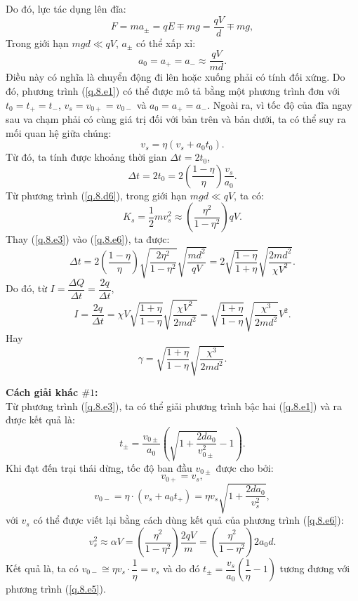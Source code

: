\begin{loigiai}
\begin{enumerate}[1)]
    Do đó, lực tác dụng lên đĩa:
    \[F = m a_{\pm} = q E \mp m g = \frac{q V}{d} \mp m g,\tag{e2}\label{q.8.e2}\]
    Trong giới hạn $m g d \ll q V$, $ a_{\pm}$ có thể xấp xỉ:
    \[a_{0} = a_{+} = a_{-} \approx \frac{q V}{m d}. \tag{e3}\label{q.8.e3}\]
    Điều này có nghĩa là chuyển động đi lên hoặc xuống phải có tính đối xứng. Do đó, phương trình (\ref{q.8.e1}) có thể được mô tả bằng một phương trình đơn với $t_0 = t_+ = t_-$, $v_s = v_{0+} = v_{0-}$ và $a_0 = a_+ = a_-$. Ngoài ra, vì tốc độ của đĩa ngay sau va chạm phải có cùng giá trị đối với bản trên và bản dưới, ta có thể suy ra mối quan hệ giữa chúng:
    \[{v}_{{s}}=\eta\left({v}_{{s}}+a_{0} t_{0}\right). \tag{e4}\label{q.8.e4}\]
    Từ đó, ta tính được khoảng thời gian $\Delta t = 2t_0$,
    \[\Delta t=2 t_{0}=2\left(\frac{1-\eta}{\eta}\right) \frac{{v}_{{s}}}{a_{0}}. \tag{e5}\label{q.8.e5}\]
    Từ phương trình (\ref{q.8.d6}), trong giới hạn $m g d \ll q V$, ta có:
    \[K_{{s}}=\dfrac{1}{2} m {v}_{{s}}^{2} \approx\left(\dfrac{\eta^{2}}{1-\eta^{2}}\right) q V.\tag{e6}\label{q.8.e6} \]
    Thay (\ref{q.8.e3}) vào (\ref{q.8.e6}), ta được:
    \[\Delta t=2\left(\dfrac{1-\eta}{\eta}\right) \sqrt{\dfrac{2 \eta^{2}}{1-\eta^{2}}} \sqrt{\dfrac{m d^{2}}{q V}}=2 \sqrt{\dfrac{1-\eta}{1+\eta}} \sqrt{\dfrac{2 m d^{2}}{\chi V^{2}}}. \tag{e7}\label{q.8.e7}\]
    Do đó, từ $I = \dfrac{\Delta Q}{\Delta t} = \dfrac{2 q}{\Delta t}$,
    \[I = \dfrac{2 q}{\Delta t}=\chi V \sqrt{\dfrac{1+\eta}{1-\eta}} \sqrt{\dfrac{\chi V^{2}}{2 m d^{2}}} = \sqrt{\dfrac{1+\eta}{1-\eta}} \sqrt{\dfrac{\chi^{3}}{2 m d^{2}}} V^{2}. \tag{e8}\label{q.8.e8}\]
    Hay 
    \[\gamma = \sqrt{\dfrac{1+\eta}{1-\eta}} \sqrt{\dfrac{\chi^{3}}{2 m d^{2}}}. \tag{e9}\label{q.8.e9}\]
    
    \textbf{Cách giải khác $\# 1$:}\\
    Từ phương trình (\ref{q.8.e3}), ta có thể giải phương trình bậc hai (\ref{q.8.e1}) và ra được kết quả là:
    \[t_{\pm}=\dfrac{{v}_{0 \pm}}{a_{0}}\left(\sqrt{1+\dfrac{2 d a_{0}}{{v}_{0 \pm}^{2}}}-1\right). \tag{e10}\label{q.8.e10} \]
    Khi đạt đến trại thái dừng, tốc độ ban đầu ${v}_{0 \pm}$ được cho bởi:
    \[{v}_{0+} = v_s, \tag{e11}\label{q.8.e11}\]
    \[{v}_{0-}=\eta \cdot\left({v}_{{s}}+a_{0} t_{+}\right)=\eta {v}_{{s}} \sqrt{1+\dfrac{2 d a_{0}}{{v}_{{s}}^{2}}}, \tag{e12}\label{q.8.e12}\]
    với $v_s$ có thể được viết lại bằng cách dùng kết quả của phương trình (\ref{q.8.e6}):
    \[{v}_{{s}}^{2} \approx \alpha V=\left(\dfrac{\eta^{2}}{1-\eta^{2}}\right) \dfrac{2 q V}{m}=\left(\dfrac{\eta^{2}}{1-\eta^{2}}\right) 2 a_{0} d. \tag{e13}\label{q.8.e13}\]
    Kết quả là, ta có ${v}_{0-} \cong \eta {v}_{{s}} \cdot \dfrac{1}{\eta}={v}_{{s}}$ và do đó $t_{\pm}=\dfrac{{v}_{{s}}}{a_{0}}\left(\dfrac{1}{\eta}-1\right)$ tương đương với phương trình (\ref{q.8.e5}).\\
    

\end{enumerate}
\end{loigiai}
